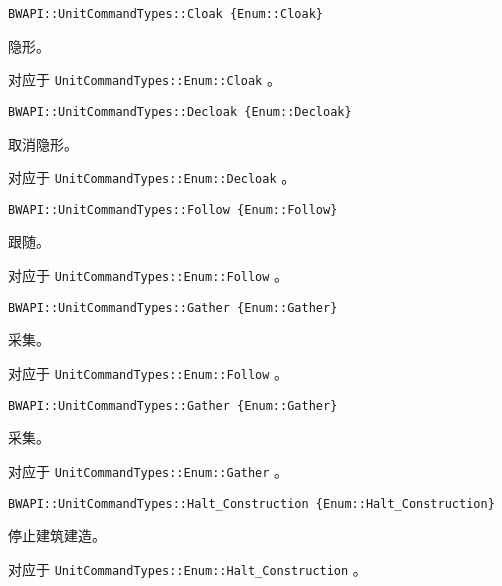 \begin{tcolorbox}[colback=white, colframe=black!60!white, title=Cloak\{\}, arc=0mm]
\begin{verbatim}
BWAPI::UnitCommandTypes::Cloak {Enum::Cloak}
\end{verbatim}
隐形。\par 对应于   \verb|UnitCommandTypes::Enum::Cloak|  。
\end{tcolorbox}


\begin{tcolorbox}[colback=white, colframe=black!60!white, title=Decloak\{\}, arc=0mm]
\begin{verbatim}
BWAPI::UnitCommandTypes::Decloak {Enum::Decloak}
\end{verbatim}
取消隐形。\par 对应于   \verb|UnitCommandTypes::Enum::Decloak|  。
\end{tcolorbox}


\begin{tcolorbox}[colback=white, colframe=black!60!white, title=Follow\{\}, arc=0mm]
\begin{verbatim}
BWAPI::UnitCommandTypes::Follow {Enum::Follow}
\end{verbatim}
跟随。\par 对应于   \verb|UnitCommandTypes::Enum::Follow|  。
\end{tcolorbox}


\begin{tcolorbox}[colback=white, colframe=black!60!white, title=Gather\{\}, arc=0mm]
\begin{verbatim}
BWAPI::UnitCommandTypes::Gather {Enum::Gather}
\end{verbatim}
采集。\par 对应于   \verb|UnitCommandTypes::Enum::Follow|  。
\end{tcolorbox}


\begin{tcolorbox}[colback=white, colframe=black!60!white, title=Gather\{\}, arc=0mm]
\begin{verbatim}
BWAPI::UnitCommandTypes::Gather {Enum::Gather}
\end{verbatim}
采集。\par 对应于   \verb|UnitCommandTypes::Enum::Gather|  。
\end{tcolorbox}


\begin{tcolorbox}[colback=white, colframe=black!60!white, title=Halt\_Construction\{\}, arc=0mm]
\begin{verbatim}
BWAPI::UnitCommandTypes::Halt_Construction {Enum::Halt_Construction}
\end{verbatim}
停止建筑建造。\par 对应于   \verb|UnitCommandTypes::Enum::Halt_Construction|  。
\end{tcolorbox}


